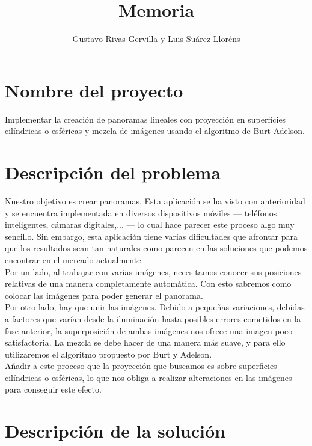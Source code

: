 \documentclass[10pt,a4paper]{article}
\author{Gustavo Rivas Gervilla y Luis Suárez Lloréns}
\title{Memoria}
\date{}
\theoremstyle{definition}
\begin{document}
\maketitle

\section{Nombre del proyecto}

Implementar la creación de panoramas lineales con proyección en superficies cilíndricas o esféricas y mezcla de imágenes usando el algoritmo de Burt-Adelson.\\

\section{Descripción del problema}

Nuestro objetivo es crear panoramas. Esta aplicación se ha visto con anterioridad y se encuentra implementada en diversos dispositivos móviles --- teléfonos inteligentes, cámaras digitales,... --- lo cual hace parecer este proceso algo muy sencillo. Sin embargo, esta aplicación tiene varias dificultades que afrontar para que los resultados sean tan naturales como parecen en las soluciones que podemos encontrar en el mercado actualmente.\\

Por un lado, al trabajar con varias imágenes, necesitamos conocer sus posiciones relativas de una manera completamente automática. Con esto sabremos como colocar las imágenes para poder generar el panorama.\\

Por otro lado, hay que unir las imágenes. Debido a pequeñas variaciones, debidas a factores que varían desde la iluminación hasta posibles errores cometidos en la fase anterior, la superposición de ambas imágenes nos ofrece una imagen poco satisfactoria. La mezcla se debe hacer de una manera más suave, y para ello utilizaremos el algoritmo propuesto por Burt y Adelson.\\

Añadir a este proceso que la proyección que buscamos es sobre superficies cilíndricas o esféricas, lo que nos obliga a realizar alteraciones en las imágenes para conseguir este efecto.\\

\section{Descripción de la solución}
\end{document}
